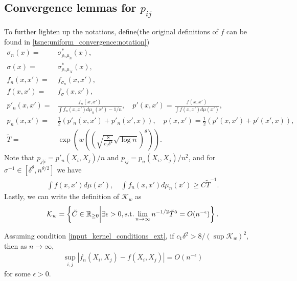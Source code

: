 \subsection{Convergence lemmas for \texorpdfstring{$p_{ij}$}{pij}}
To further lighten up the notations, define(the original definitions of $f$ can be found in \eqref{tsne:uniform_convergence:notation})
\begin{align} \label{tsne:convergence_lemmas:notation}
    \sigma_n(x) = & \sigma_{\rho,\mu_n}^*(x), \nonumber                                                                                \\
    \sigma(x)   = & \sigma_{\rho,\mu_X}^*(x), \nonumber                                                                                \\
    f_n(x,x') =   & f_{\sigma_n}(x,x'), \nonumber                                                                                      \\
    f(x,x')   =   & f_{\sigma}(x,x'), \nonumber                                                                                        \\
    p'_n(x,x') =  & \frac{f_n(x,x')}{\int f_n(x,x')d\mu_n(x') - 1/n}, \quad p'(x,x') = \frac{f(x,x')}{\int f(x,x')d\mu(x')}, \nonumber \\
    p_n(x,x') =   & \frac{1}{2}(p'_n(x,x')+p'_n(x',x)), \quad p(x,x') = \frac{1}{2}(p'(x,x')+p'(x',x)), \nonumber                      \\
    \tilde{T} =   & \exp \left(w\left(\left(\sqrt{\frac{8}{c_1\delta^2}}\sqrt{\log n} \right)^{\theta} \right) \right).
\end{align}
Note that $p_{j|i} = p'_n(X_i,X_j)/n$ and $p_{ij} = p_n(X_i,X_j)/n^2$, and for $\sigma^{-1} \in [\delta^{\theta},n^{\theta/2}]$ we have
\begin{align} \label{tsne:important_bounds}
    \int f(x,x')d\mu(x'), \quad \int f_n(x,x')d\mu_n(x') \geq C\tilde{T}^{-1}.
\end{align}
Lastly, we can write the definition of $\mathcal{K}_w$ as
\begin{align} \label{tsne:kw_simplified}
    \mathcal{K}_w = \left\{\tilde{C} \in \mathbb{R}_{\geq 0} \bigg\rvert \exists \epsilon>0, \text{\normalfont s.t.} \lim_{n \to \infty} n^{-1/2} \tilde{T}^5 = O(n^{-\epsilon}) \right\}.
\end{align}
\begin{lemma} \label{tsne:f_n_convergence_lemma}
    Assuming condition \ref{input_kernel_conditions_ext}, if $c_1\delta^2 > 8/(\sup \mathcal{K}_w)^2$, then as $n \to \infty$,
    \begin{align}
        \sup_{i,j} \left|f_n(X_i,X_j) - f(X_i,X_j)\right| = O(n^{-\epsilon})
    \end{align}
    for some $\epsilon>0$.
\end{lemma}
